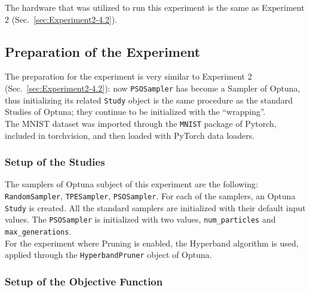 The hardware that was utilized to run this experiment is the same as Experiment 2 (Sec.~\ref{sec:Experiment2-4.2}).

\subsection{Preparation of the Experiment}

The preparation for the experiment is very similar to Experiment 2 (Sec.~\ref{sec:Experiment2-4.2}): now \texttt{PSOSampler} has become a Sampler of Optuna, thus initializing its related \texttt{Study} object is the same procedure as the standard Studies of Optuna; they continue to be initialized with the “wrapping”.
\\[0.3cm]The MNIST dataset was imported through the \texttt{MNIST} package of Pytorch, included in torchvision, and then loaded with PyTorch data loaders.

\subsubsection{Setup of the Studies}

The samplers of Optuna subject of this experiment are the following: \texttt{RandomSampler}, \texttt{TPESampler}, \texttt{PSOSampler}.
For each of the samplers, an Optuna \texttt{Study} is created. All the standard samplers are initialized with their default input values. The \texttt{PSOSampler} is initialized with two values, \texttt{num\_particles} and \texttt{max\_generations}.
\\[0.3cm]For the experiment where Pruning is enabled, the Hyperband algorithm is used, applied through the \texttt{HyperbandPruner} object of Optuna.

\subsubsection{Setup of the Objective Function}

